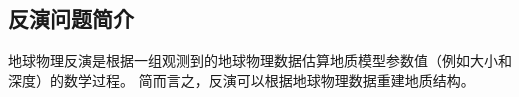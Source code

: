 %
%
%
%
%
%
%
%
%
%

\subsection{反演问题简介}

地球物理反演是根据一组观测到的地球物理数据估算地质模型参数值（例如大小和深度）的数学过程。 简而言之，反演可以根据地球物理数据重建地质结构。